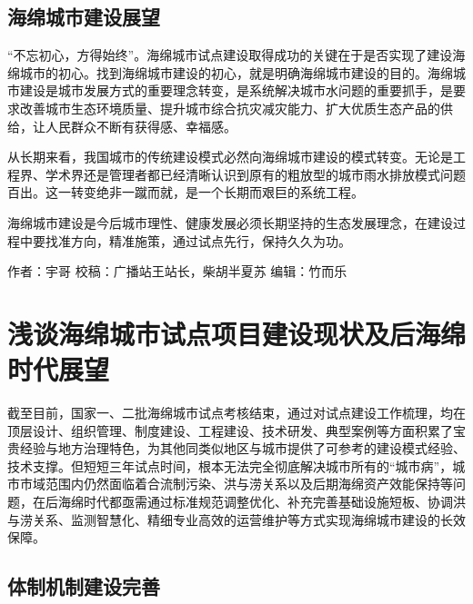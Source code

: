 \documentclass[]{book}
\begin{document}
\hypertarget{ux6d77ux7ef5ux57ceux5e02ux5efaux8bbeux5c55ux671b}{%
\subsection{海绵城市建设展望}\label{ux6d77ux7ef5ux57ceux5e02ux5efaux8bbeux5c55ux671b}}

``不忘初心，方得始终''。海绵城市试点建设取得成功的关键在于是否实现了建设海绵城市的初心。找到海绵城市建设的初心，就是明确海绵城市建设的目的。海绵城市建设是城市发展方式的重要理念转变，是系统解决城市水问题的重要抓手，是要求改善城市生态环境质量、提升城市综合抗灾减灾能力、扩大优质生态产品的供给，让人民群众不断有获得感、幸福感。

从长期来看，我国城市的传统建设模式必然向海绵城市建设的模式转变。无论是工程界、学术界还是管理者都已经清晰认识到原有的粗放型的城市雨水排放模式问题百出。这一转变绝非一蹴而就，是一个长期而艰巨的系统工程。

海绵城市建设是今后城市理性、健康发展必须长期坚持的生态发展理念，在建设过程中要找准方向，精准施策，通过试点先行，保持久久为功。

作者：宇哥
校稿：广播站王站长，柴胡半夏苏
编辑：竹而乐

\hypertarget{ux6d45ux8c08ux6d77ux7ef5ux57ceux5e02ux8bd5ux70b9ux9879ux76eeux5efaux8bbeux73b0ux72b6ux53caux540eux6d77ux7ef5ux65f6ux4ee3ux5c55ux671b}{%
\section{浅谈海绵城市试点项目建设现状及后海绵时代展望}\label{ux6d45ux8c08ux6d77ux7ef5ux57ceux5e02ux8bd5ux70b9ux9879ux76eeux5efaux8bbeux73b0ux72b6ux53caux540eux6d77ux7ef5ux65f6ux4ee3ux5c55ux671b}}

截至目前，国家一、二批海绵城市试点考核结束，通过对试点建设工作梳理，均在顶层设计、组织管理、制度建设、工程建设、技术研发、典型案例等方面积累了宝贵经验与地方治理特色，为其他同类似地区与城市提供了可参考的建设模式经验、技术支撑。但短短三年试点时间，根本无法完全彻底解决城市所有的``城市病''，城市市域范围内仍然面临着合流制污染、洪与涝关系以及后期海绵资产效能保持等问题，在后海绵时代都亟需通过标准规范调整优化、补充完善基础设施短板、协调洪与涝关系、监测智慧化、精细专业高效的运营维护等方式实现海绵城市建设的长效保障。

\hypertarget{ux4f53ux5236ux673aux5236ux5efaux8bbeux5b8cux5584}{%
\subsection{体制机制建设完善}\label{ux4f53ux5236ux673aux5236ux5efaux8bbeux5b8cux5584}}
\end{document}
